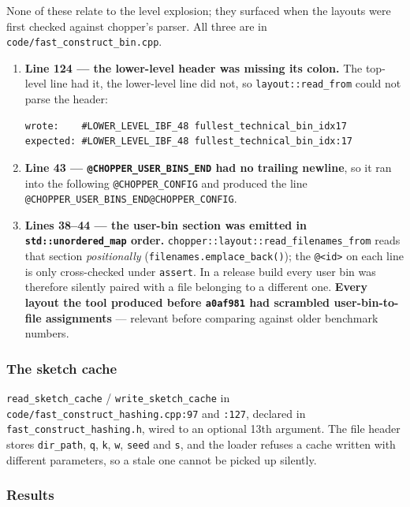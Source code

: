 \documentclass[11pt,a4paper]{article}
\newcommand{\code}[1]{\lstinline[basicstyle=\ttfamily\small]!#1!}
\newcommand{\sha}[1]{\texttt{#1}}
\begin{document}
None of these relate to the level explosion; they surfaced when the layouts were first checked
against chopper's parser. All three are in \texttt{code/fast\_construct\_bin.cpp}.

\begin{enumerate}[leftmargin=*]
\item \textbf{Line 124 --- the lower-level header was missing its colon.} The top-level line had
it, the lower-level line did not, so \code{layout::read_from} could not parse the header:
\begin{lstlisting}[style=codestyle]
wrote:    #LOWER_LEVEL_IBF_48 fullest_technical_bin_idx17
expected: #LOWER_LEVEL_IBF_48 fullest_technical_bin_idx:17
\end{lstlisting}
\item \textbf{Line 43 --- \code{@CHOPPER_USER_BINS_END} had no trailing newline}, so it ran into
the following \code{@CHOPPER_CONFIG} and produced the line
\code{@CHOPPER_USER_BINS_END@CHOPPER_CONFIG}.
\item \textbf{Lines 38--44 --- the user-bin section was emitted in
\code{std::unordered_map} order.} \code{chopper::layout::read_filenames_from} reads that section
\emph{positionally} (\code{filenames.emplace_back()}); the \code{@<id>} on each line is only
cross-checked under \code{assert}. In a release build every user bin was therefore silently paired
with a file belonging to a different one. \textbf{Every layout the tool produced before
\sha{a0af981} had scrambled user-bin-to-file assignments} --- relevant before comparing against
older benchmark numbers.
\end{enumerate}

\subsubsection*{The sketch cache}

\code{read_sketch_cache} / \code{write_sketch_cache} in
\texttt{code/fast\_construct\_hashing.cpp:97} and \texttt{:127}, declared in
\texttt{fast\_construct\_hashing.h}, wired to an optional 13th argument. The file header stores
\code{dir_path}, \code{q}, \code{k}, \code{w}, \code{seed} and \code{s}, and the loader refuses a
cache written with different parameters, so a stale one cannot be picked up silently.

\subsubsection*{Results}
\end{document}
